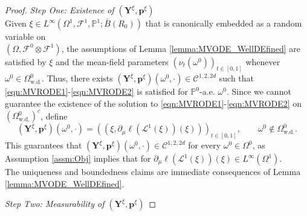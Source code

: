 \documentclass{article}
\begin{document}
\begin{appendices}
\begin{proof}
\textit{Step One: Existence of $(\bm{Y}^{\xi}, \bm{p}^\xi)$}\\

Given $\xi \in L^\infty(\Omega^1,\mathcal F^1,\mathbb P^1; \bar B(R_0))$ that is canonically embedded as a random variable on \\$(\Omega,\mathcal F^0\otimes \mathcal F^1)$, the assumptions of Lemma \ref{lemma:MVODE_WellDEfined} are satisfied by $\xi$ and the mean-field parameters $(\nu_t(\omega^0))_{t\in[0,1]}$ whenever $\omega^0\in \Omega^0_\mathrm{w.d.}$. Thus, there exists $(\bm{Y}^\xi,\bm{p}^\xi)(\omega^0,\cdot)\in \mathscr{C}^{1,2,2d}$ such that \eqref{eqn:MVRODE1}-\eqref{eqn:MVRODE2} is satisfied for $\mathbb P^0$-a.e. $\omega^0$. Since we cannot guarantee the existence of the solution to  \eqref{eqn:MVRODE1}-\eqref{eqn:MVRODE2} on $(\Omega^0_\mathrm{w.d.})^c$, define $$(\bm{Y}^\xi,\bm{p}^\xi)(\omega^0,\cdot)=\left((\xi,\partial_\mu\ell(\mathcal L^1(\xi))(\xi))\right)_{t\in[0,1]}, \qquad \omega^0\notin\Omega^0_\mathrm{w.d.}.$$ This guarantees that $(\bm{Y}^\xi,\bm{p}^\xi)(\omega^0,\cdot)\in\mathscr{C}^{1,2,2d}$ for every $\omega^0\in \Omega^0$, as Assumption \ref{assm:Obj} implies that  for $\partial_\mu\ell(\mathcal L^1(\xi))(\xi)\in L^\infty(\Omega^1)$.\\

The uniqueness and boundedness claims are immediate consequences of Lemma \ref{lemma:MVODE_WellDEfined}.

\textit{Step Two: Measurability of $(\bm{Y}^\xi,\bm{p}^\xi)$}


\end{proof}
\end{appendices}
\end{document}
